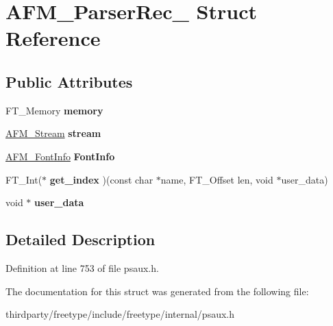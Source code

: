\hypertarget{struct_a_f_m___parser_rec__}{}\section{A\+F\+M\+\_\+\+Parser\+Rec\+\_\+ Struct Reference}
\label{struct_a_f_m___parser_rec__}
\subsection*{Public Attributes}
\begin{DoxyCompactItemize}
\item 
\mbox{\label{struct_a_f_m___parser_rec___a3fec8b1760fa9261f48ee87dc2b3858b}} 
F\+T\+\_\+\+Memory {\bfseries memory}
\item 
\mbox{\label{struct_a_f_m___parser_rec___adf3b1165216cbd1f7ec7ae736fd4270a}} 
\hyperlink{struct_a_f_m___stream_rec__}{A\+F\+M\+\_\+\+Stream} {\bfseries stream}
\item 
\mbox{\label{struct_a_f_m___parser_rec___ae53d6cddac32a0eb7014c3a9f74517df}} 
\hyperlink{struct_a_f_m___font_info_rec__}{A\+F\+M\+\_\+\+Font\+Info} {\bfseries Font\+Info}
\item 
\mbox{\label{struct_a_f_m___parser_rec___a9d33b62410351d72878f0f14007e7385}} 
F\+T\+\_\+\+Int($\ast$ {\bfseries get\+\_\+index} )(const char $\ast$name, F\+T\+\_\+\+Offset len, void $\ast$user\+\_\+data)
\item 
\mbox{\label{struct_a_f_m___parser_rec___a9fa78a781737bf27e00448c5092b7657}} 
void $\ast$ {\bfseries user\+\_\+data}
\end{DoxyCompactItemize}


\subsection{Detailed Description}


Definition at line 753 of file psaux.\+h.



The documentation for this struct was generated from the following file\+:\begin{DoxyCompactItemize}
\item 
thirdparty/freetype/include/freetype/internal/psaux.\+h\end{DoxyCompactItemize}
